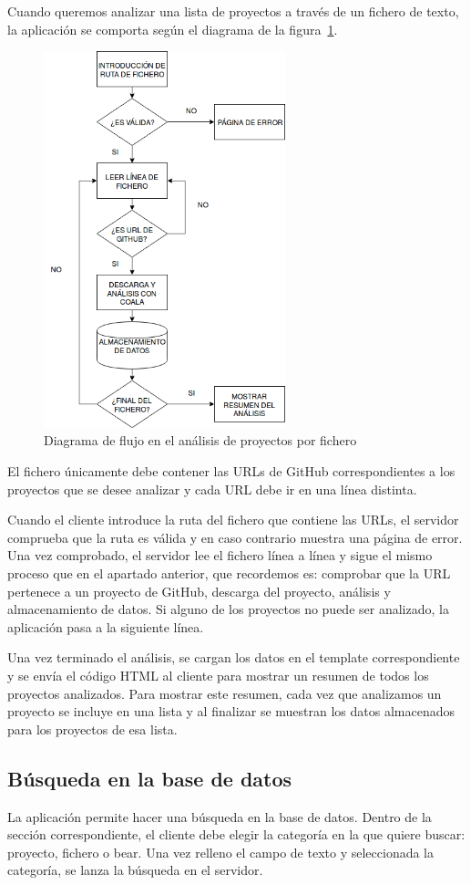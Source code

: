 \documentclass[a4paper, 12pt]{book}
\begin{document}
Cuando queremos analizar una lista de proyectos a través de un fichero de texto, la aplicación se comporta según el diagrama de la figura~\ref{fig:AnalizarFichero}.
\begin{figure}[h]
  \centering
  \includegraphics[width=7cm, keepaspectratio]{img/AnalizarFichero}
  \caption{Diagrama de flujo en el análisis de proyectos por fichero}
  \label{fig:AnalizarFichero}
\end{figure}
El fichero únicamente debe contener las URLs de GitHub correspondientes a los proyectos que se desee analizar y cada URL debe ir en una línea distinta.

Cuando el cliente introduce la ruta del fichero que contiene las URLs, el servidor comprueba que la ruta es válida y en caso contrario muestra una página de error. Una vez comprobado, el servidor lee el fichero línea a línea y sigue el mismo proceso que en el apartado anterior, que recordemos es: comprobar que la URL pertenece a un proyecto de GitHub, descarga del proyecto, análisis y almacenamiento de datos. Si alguno de los proyectos no puede ser analizado, la aplicación pasa a la siguiente línea.

Una vez terminado el análisis, se cargan los datos en el template correspondiente y se envía el código HTML al cliente para mostrar un resumen de todos los proyectos analizados. Para mostrar este resumen, cada vez que analizamos un proyecto se incluye en una lista y al finalizar se muestran los datos almacenados para los proyectos de esa lista.

\subsection{Búsqueda en la base de datos}
\label{sec:seccion12.2}
La aplicación permite hacer una búsqueda en la base de datos. Dentro de la sección correspondiente, el cliente debe elegir la categoría en la que quiere buscar: proyecto, fichero o bear. Una vez relleno el campo de texto y seleccionada la categoría, se lanza la búsqueda en el servidor.
\end{document}
